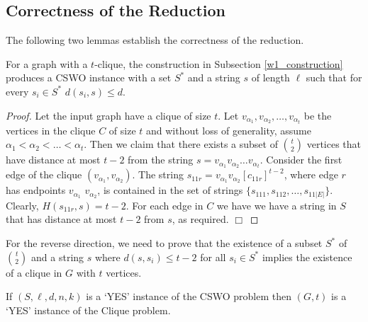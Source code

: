 \subsection{Correctness of the Reduction}

The following two lemmas establish the correctness of the reduction. 

\begin{lemma} \label{direction_one_lemma} For a graph with a $t$-clique, the construction in Subsection \ref{w1_construction}  produces a {\sc CSWO} instance with a set $S^*$ and a string $s$ of length $\ell$ such that for every $s_i \in S^*$ $d(s_i, s) \leq d$. \end{lemma}

\begin{proof} Let the input graph have a clique of size $t$.  Let $v_{\alpha_1}, v_{\alpha_2}, \ldots, v_{\alpha_t}$ be the vertices in the clique $C$ of size $t$ and without loss of generality, assume $\alpha_1 < \alpha_2 < \ldots < \alpha_t$.  Then we claim that there exists a subset of ${t\choose 2}$ vertices that have distance at most $t - 2$ from the string $s = v_{\alpha_1} v_{\alpha_2} \ldots v_{\alpha_t}$.   Consider the first edge of the clique $(v_{\alpha_1}, v_{\alpha_2})$.  The string $s_{11r} = v_{\alpha_1} v_{\alpha_2} [c_{11r}]^{t - 2}$, where edge $r$ has endpoints  $v_{\alpha_1}$ $v_{\alpha_2}$, is contained in the set of strings $\{s_{111}, s_{112}, \ldots, s_{11|E|} \}$. Clearly, $H(s_{11r}, s) = t - 2$. For each edge in $C$ we have we have a string in $S$ that has distance at most $t - 2$ from $s$, as required.  \hfill $\Box$ \end{proof}

For the reverse direction, we need to prove that the existence of a subset $S^*$ of ${t \choose 2}$ and a string $s$ where $d(s, s_i) \leq t - 2$ for all $s_i \in S^*$ implies the existence of a clique in $G$ with $t$ vertices.  

\begin{lemma} \label{direction_two_lemma} If $(S, \ell, d, n, k)$ is a `YES' instance of the {\sc CSWO} problem then $(G, t)$ is a `YES' instance of the {\sc Clique} problem.  \end{lemma}

